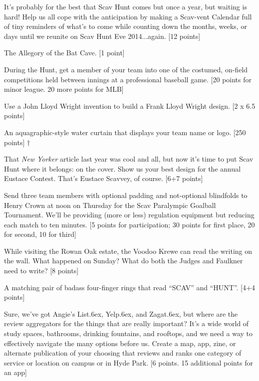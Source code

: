 \documentclass{book}
\def\tr{\raise.6ex\hbox{\scriptsize \textregistered}}
\begin{document}
\begin{list}{}{}
\item It's probably for the best that Scav Hunt comes but once a year, but waiting is hard! Help us all cope with the anticipation by making a Scav-vent Calendar full of tiny reminders of what's to come while counting down the months, weeks, or days until we reunite on Scav Hunt Eve 2014...again. [12 points]

\item The Allegory of the Bat Cave. [1 point]

\item During the Hunt, get a member of your team into one of the costumed, on-field competitions held between innings at a professional baseball game. [20 points for minor league. 20 more points for MLB]

\item Use a John Lloyd Wright invention to build a Frank Lloyd Wright design. [2 x 6.5 points]

\item An aquagraphic-style  water curtain that displays your team name or logo. [250 points] $\dagger$

\item That \emph{New Yorker} article last year was cool and all, but now it's time to put Scav Hunt where it belongs: on the cover. Show us your best design for the annual Eustace Contest. That's Eustace Scavvey, of course. [6+7 points] 

\item Send three team members with optional padding and not-optional blindfolds to Henry Crown at noon on Thursday for the Scav Paralympic Goalball Tournament. We'll be providing (more or less) regulation equipment but reducing each match to ten minutes. [5 points for participation; 30 points for first place, 20 for second, 10 for third]

\item While visiting the Rowan Oak estate, the Voodoo Krewe can read the writing on the wall. What happened on Sunday? What do both the Judges and Faulkner need to write? [8 points] 

\item A matching pair of badass four-finger rings that read ``SCAV'' and ``HUNT''. [4+4 points]

\setcounter{items}{213}

\newpage


\item Sure, we've got Angie's List\tr, Yelp\tr, and Zagat\tr, but where are the review aggregators for the things that are really important? It's a wide world of study spaces, bathrooms, drinking fountains, and rooftops, and we need a way to effectively navigate the many options before us. Create a map, app, zine, or alternate publication of your choosing that reviews and ranks one category of service or location on campus or in Hyde Park. [6 points. 15 additional points for an app]


\end{list}
\end{document}
